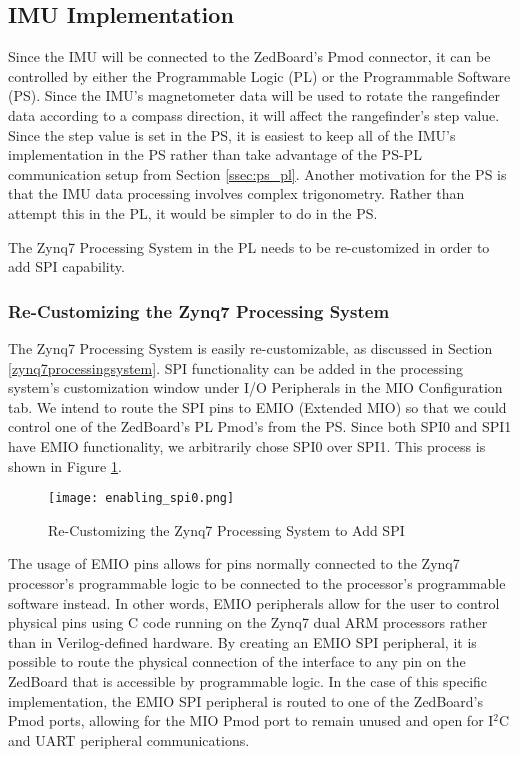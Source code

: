 \subsection{IMU Implementation}
Since the IMU will be connected to the ZedBoard's Pmod connector, it can be controlled by either the Programmable Logic (PL) or the Programmable Software (PS). Since the IMU's magnetometer data will be used to rotate the rangefinder data according to a compass direction, it will affect the rangefinder's step value. Since the step value is set in the PS, it is easiest to keep all of the IMU's implementation in the PS rather than take advantage of the PS-PL communication setup from Section \ref{ssec:ps_pl}. Another motivation for the PS is that the IMU data processing involves complex trigonometry. Rather than attempt this in the PL, it would be simpler to do in the PS.
\par
The Zynq7 Processing System in the PL needs to be re-customized in order to add SPI capability.

\subsubsection{Re-Customizing the Zynq7 Processing System}
The Zynq7 Processing System is easily re-customizable, as discussed in Section \ref{zynq7processingsystem}. SPI functionality can be added in the processing system's customization window under I/O Peripherals in the MIO Configuration tab. We intend to route the SPI pins to EMIO (Extended MIO) so that we could control one of the ZedBoard's PL Pmod's from the PS. Since both SPI0 and SPI1 have EMIO functionality, we arbitrarily chose SPI0 over SPI1. This process is shown in Figure \ref{enabling_spi0}.

\begin{figure}[H]
	\centerline{\texttt{[image: enabling\_spi0.png]}}
	\caption{Re-Customizing the Zynq7 Processing System to Add SPI}
	\label{enabling_spi0}
\end{figure}

\par
The usage of EMIO pins allows for pins normally connected to the Zynq7 processor's programmable logic to be connected to the processor's programmable software instead. In other words, EMIO peripherals allow for the user to control physical pins using C code running on the Zynq7 dual ARM processors rather than in Verilog-defined hardware. By creating an EMIO SPI peripheral, it is possible to route the physical connection of the interface to any pin on the ZedBoard that is accessible by programmable logic. In the case of this specific implementation, the EMIO SPI peripheral is routed to one of the ZedBoard's Pmod ports, allowing for the MIO Pmod port to remain unused and open for I$^2$C and UART peripheral communications.






